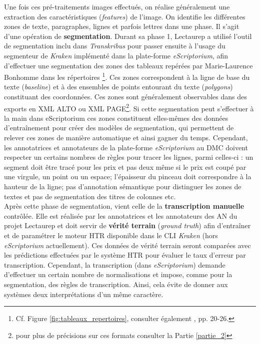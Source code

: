 Une fois ces pré-traitements images effectués, on réalise généralement une extraction des caractéristiques (\textit{features}) de l'image. On identifie les différentes zones de texte, paragraphes, lignes et parfois lettres dans une phase. Il s'agit d'une opération de \textbf{segmentation}. Durant sa phase 1, Lectaurep a utilisé l'outil de segmentation inclu dans \textit{Transkribus} pour passer ensuite à l'usage du segmenteur de \textit{Kraken} implémenté dans la plate-forme \textit{eScriptorium}, afin d'effectuer une segmentation des zones des tableaux repérées par Marie-Laurence Bonhomme dans les répertoires \footnote{Cf. Figure \ref{fig:tableaux_repertoires}, consulter également \cite{bonhomme_defis_2018}, pp. 20-26.}. Ces zones correspondent à la ligne de base du texte (\textit{baseline}) et à des ensembles de points entourant du texte (\textit{polygons}) constituant des coordonnées. Ces zones sont généralement observables dans des exports en XML ALTO ou XML PAGE\footnote{pour plus de précisions sur ces formats consulter la Partie \ref{partie_2}}. Si cette segmentation peut s'effectuer à la main dans eScriptorium ces zones constituent elles-mêmes des données d'entraînement pour créer des modèles de segmentation, qui permettent de relever ces zones de manière automatique et ainsi gagner du temps. Cependant, les annotatrices et annotateurs de la plate-forme \textit{eScriptorium} au DMC doivent respecter un certains nombres de règles pour tracer les lignes, parmi celles-ci : un segment doit être tracé pour les prix et pas deux même si le prix est coupé par une virgule, un point ou un espace; l'épaisseur du pinceau doit correspondre à la hauteur de la ligne; pas d'annotation sémantique pour distinguer les zones de textes et pas de segmentation des titres de colonnes etc.\\

Après cette phase de segmentation, vient celle de la \textbf{transcription manuelle} contrôlée. Elle est réalisée par les annotatrices et les annotateurs des AN du projet Lectaurep et doit servir de \textbf{vérité terrain} (\textit{ground truth}) afin d'entraîner et de paramétrer le moteur HTR disponible dans le CLI \textit{Kraken} (hors \textit{eScriptorium} actuellement). Ces données de vérité terrain seront comparées avec les prédictions effectuées par le système HTR pour évaluer le taux d'erreur par transcription. Cependant, la transcription  (dans \textit{eScriptorium}) demande d'effectuer un certain nombre de normalisations et impose, comme pour la segmentation, des règles de transcription. Ainsi, cela évite de donner aux systèmes deux interprétations d'un même caractère.\\

